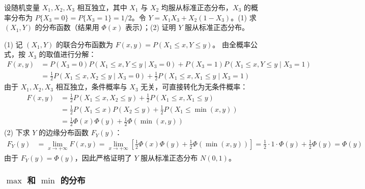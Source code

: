 \documentclass[lang=cn,11pt]{elegantbook}
\begin{document}
\begin{exercise} \label{exer:3-8d}
设随机变量 $X_1, X_2, X_3$ 相互独立，其中 $X_1$ 与 $X_2$ 均服从标准正态分布，$X_3$ 的概率分布为 $P\{X_3 = 0\} = P\{X_3 = 1\} = 1/2$。令  $Y = X_1 X_3 + X_2 (1-X_3)$。(1) 求 $(X_1, Y)$ 的分布函数（结果用 $\Phi(x)$ 表示）；(2) 证明 $Y$ 服从标准正态分布。
\end{exercise}
\begin{solution}
(1) 记 $(X_1, Y)$ 的联合分布函数为 $F(x,y) = P(X_1 \leqslant x, Y \leqslant y)$。
由全概率公式，按 $X_3$ 的取值进行分解：
\begin{align*}
    F(x,y) &= P(X_3 = 0) P(X_1 \leqslant x, Y \leqslant y \mid X_3 = 0) + P(X_3 = 1) P(X_1 \leqslant x, Y \leqslant y \mid X_3 = 1) \\
    &= \frac{1}{2} P(X_1 \leqslant x, X_2 \leqslant y \mid X_3 = 0) + \frac{1}{2} P(X_1 \leqslant x, X_1 \leqslant y \mid X_3 = 1)
\end{align*}
由于 $X_1, X_2, X_3$ 相互独立，条件概率与 $X_3$ 无关，可直接转化为无条件概率：
\begin{align*}
    F(x,y) &= \frac{1}{2} P(X_1 \leqslant x, X_2 \leqslant y) + \frac{1}{2} P(X_1 \leqslant x, X_1 \leqslant y) \\
    &= \frac{1}{2} P(X_1 \leqslant x)P(X_2 \leqslant y) + \frac{1}{2} P(X_1 \leqslant \min(x,y)) \\
    &= \frac{1}{2} \Phi(x)\Phi(y) + \frac{1}{2} \Phi(\min(x,y))
\end{align*}
(2) 下求 $Y$ 的边缘分布函数 $F_Y(y)$：
\begin{align*}
    F_Y(y) &= \lim_{x \to +\infty} F(x,y) = \lim_{x \to +\infty} \left[ \frac{1}{2} \Phi(x)\Phi(y) + \frac{1}{2} \Phi(\min(x,y)) \right] = \frac{1}{2} \cdot 1 \cdot \Phi(y) + \frac{1}{2} \Phi(y) = \Phi(y)
\end{align*}
由于 $F_Y(y) = \Phi(y)$，因此严格证明了 $Y$ 服从标准正态分布 $N(0,1)$。
\end{solution}

\subsubsection{\texorpdfstring{$\max$ 和 $\min$ 的分布}{max 和 min 的分布}}
\end{document}
